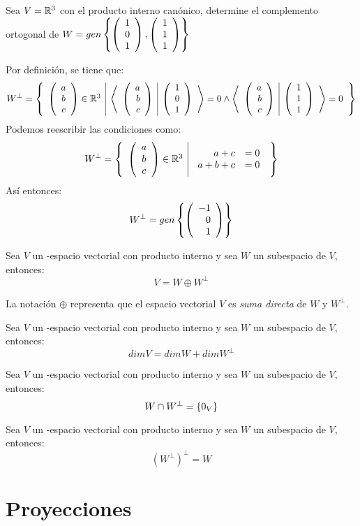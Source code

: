\begin{ejemplo}
    Sea $V = \mathbb{R}^3$ con el producto interno canónico, determine el complemento ortogonal de $W = gen \left\{\left( \begin{array}{r} 1\\ 0\\ 1 \end{array} \right) , \left( \begin{array}{r} 1\\ 1\\ 1 \end{array} \right)  \right\} $
\end{ejemplo}
\begin{sol}
Por definición, se tiene que:
$$W^\perp= \left\{\begin{array}{c|c} {\left( \begin{array}{c} a\\ b\\ c \end{array}\right) \in \mathbb{R}^3 }&{\left\langle \begin{array}{c|c} \left( \begin{array}{r} a\\ b\\ c \end{array} \right)  & \left( \begin{array}{r} 1\\ 0\\ 1 \end{array} \right)  \end{array}\right\rangle = 0 \land \left\langle \begin{array}{c|c} \left( \begin{array}{r} a\\ b\\ c \end{array} \right)  & \left( \begin{array}{r} 1\\ 1\\ 1 \end{array} \right)  \end{array}\right\rangle = 0} \end{array} \right\}$$
Podemos reescribir las condiciones como:
$$W^\perp= \left\{\begin{array}{c|c} {\left( \begin{array}{c} a\\ b\\ c \end{array}\right) \in \mathbb{R}^3 }&{\begin{array}{rl}
    a + c &= 0\\ 
    a+b+c &= 0
\end{array}} \end{array} \right\}$$
Así entonces:
$$W^\perp = gen \left\{\left( \begin{array}{r} -1\\ 0\\ 1 \end{array} \right)  \right\} $$
\end{sol}

\begin{theorem}
    Sea $V$ un \dobleK-espacio vectorial con producto interno y sea $W$ un subespacio de $V$, entonces:
    $$V = W \oplus W^\perp $$
\end{theorem}
\begin{obs}
    La notación $\oplus$ representa que el espacio vectorial $V$ es \textit{suma directa} de $W$ y $W^\perp$.
\end{obs}
\begin{theorem}[corolario]
    Sea $V$ un \dobleK-espacio vectorial con producto interno y sea $W$ un subespacio de $V$, entonces:
    $$dimV = dimW + dimW^\perp $$
\end{theorem}
\begin{theorem}[corolario]
    Sea $V$ un \dobleK-espacio vectorial con producto interno y sea $W$ un subespacio de $V$, entonces:
    $$W \cap W^\perp =  \left\{0_V \right\} $$
\end{theorem}

\begin{theorem}
    Sea $V$ un \dobleK-espacio vectorial con producto interno y sea $W$ un subespacio de $V$, entonces:
    $$(W^\perp)^\perp = W$$
\end{theorem}

\section{Proyecciones}

